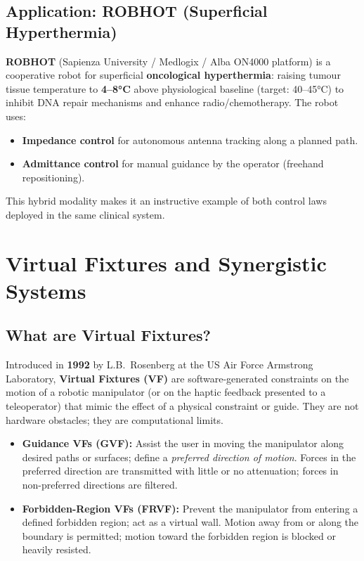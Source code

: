 \documentclass[11pt,a4paper,twoside]{report}
\begin{document}
\section{Application: ROBHOT (Superficial Hyperthermia)}
\textbf{ROBHOT} (Sapienza University / Medlogix / Alba ON4000 platform) is a cooperative robot for superficial \textbf{oncological hyperthermia}: raising tumour tissue temperature to \textbf{4--8°C} above physiological baseline (target: 40--45°C) to inhibit DNA repair mechanisms and enhance radio/chemotherapy. The robot uses:
\begin{itemize}
    \item \textbf{Impedance control} for autonomous antenna tracking along a planned path.
    \item \textbf{Admittance control} for manual guidance by the operator (freehand repositioning).
\end{itemize}
This hybrid modality makes it an instructive example of both control laws deployed in the same clinical system.

\chapter{Virtual Fixtures and Synergistic Systems}

\section{What are Virtual Fixtures?}
Introduced in \textbf{1992} by L.B.\ Rosenberg at the US Air Force Armstrong Laboratory, \textbf{Virtual Fixtures (VF)} are software-generated constraints on the motion of a robotic manipulator (or on the haptic feedback presented to a teleoperator) that mimic the effect of a physical constraint or guide. They are not hardware obstacles; they are computational limits.
\begin{itemize}
    \item \textbf{Guidance VFs (GVF):} Assist the user in moving the manipulator along desired paths or surfaces; define a \textit{preferred direction of motion}. Forces in the preferred direction are transmitted with little or no attenuation; forces in non-preferred directions are filtered.
    \item \textbf{Forbidden-Region VFs (FRVF):} Prevent the manipulator from entering a defined forbidden region; act as a virtual wall. Motion away from or along the boundary is permitted; motion toward the forbidden region is blocked or heavily resisted.
\end{itemize}
\end{document}
